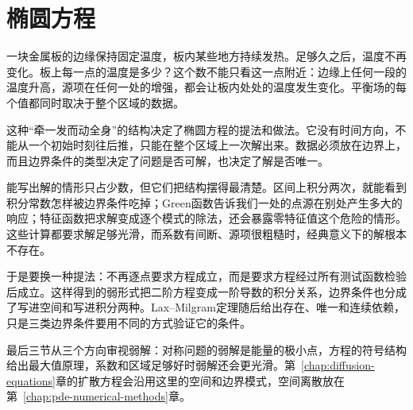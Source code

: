 \chapter{椭圆方程}
\label{chap:elliptic-equations}

一块金属板的边缘保持固定温度，板内某些地方持续发热。足够久之后，温度不再变化。板上每一点的温度是多少？这个数不能只看这一点附近：边缘上任何一段的温度升高，源项在任何一处的增强，都会让板内处处的温度发生变化。平衡场的每个值都同时取决于整个区域的数据。

这种“牵一发而动全身”的结构决定了椭圆方程的提法和做法。它没有时间方向，不能从一个初始时刻往后推，只能在整个区域上一次解出来。数据必须放在边界上，而且边界条件的类型决定了问题是否可解，也决定了解是否唯一。

能写出解的情形只占少数，但它们把结构摆得最清楚。区间上积分两次，就能看到积分常数怎样被边界条件吃掉；Green函数告诉我们一处的点源在别处产生多大的响应；特征函数把求解变成逐个模式的除法，还会暴露零特征值这个危险的情形。这些计算都要求解足够光滑，而系数有间断、源项很粗糙时，经典意义下的解根本不存在。

于是要换一种提法：不再逐点要求方程成立，而是要求方程经过所有测试函数检验后成立。这样得到的弱形式把二阶方程变成一阶导数的积分关系，边界条件也分成了写进空间和写进积分两种。Lax--Milgram定理随后给出存在、唯一和连续依赖，只是三类边界条件要用不同的方式验证它的条件。

最后三节从三个方向审视弱解：对称问题的弱解是能量的极小点，方程的符号结构给出最大值原理，系数和区域足够好时弱解还会更光滑。第~\ref{chap:diffusion-equations}章的扩散方程会沿用这里的空间和边界模式，空间离散放在第~\ref{chap:pde-numerical-methods}章。
















